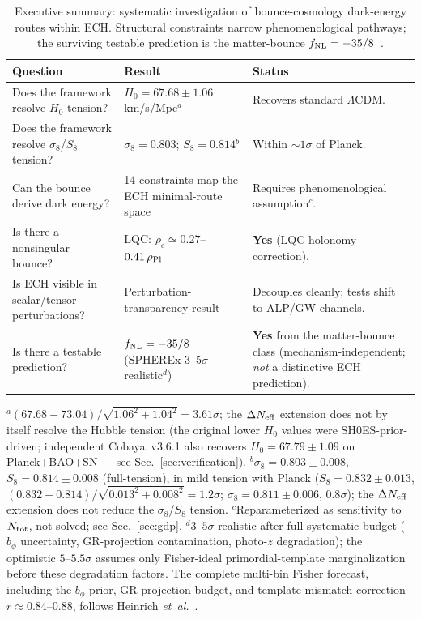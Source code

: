 \documentclass[aps,prd,twocolumn,superscriptaddress,showpacs,preprintnumbers,nofootinbib,longbibliography,floatfix]{revtex4-2}
\newcommand{\rhoPl}{\rho_{\rm Pl}}
\newcommand{\Neff}{N_{\rm eff}}
\newcommand{\etal}{\textit{et~al.}}
\begin{document}
\begin{table}[tb]
\caption{\label{tab:summary} Executive summary: systematic investigation of bounce-cosmology dark-energy routes within ECH. Structural constraints narrow phenomenological pathways; the surviving testable prediction is the matter-bounce $f_{\rm NL} = -35/8$~\cite{Cai:2009fn}.}
\begin{ruledtabular}
\begin{tabular}{lll}
\textbf{Question} & \textbf{Result} & \textbf{Status} \\
\hline
Does the framework resolve $H_0$ tension? & $H_0 = 67.68\pm 1.06$ km/s/Mpc$^a$ & Recovers standard $\Lambda$CDM. \\
Does the framework resolve $\sigma_8$/$S_8$ tension? & $\sigma_8 = 0.803$; $S_8 = 0.814$$^b$ & Within ${\sim}1\sigma$ of Planck. \\
Can the bounce derive dark energy? & 14 constraints map the ECH minimal-route space & Requires phenomenological assumption$^c$. \\
Is there a nonsingular bounce? & LQC: $\rho_c \simeq 0.27$--$0.41\,\rhoPl$ & \textbf{Yes} (LQC holonomy correction). \\
Is ECH visible in scalar/tensor perturbations? & Perturbation-transparency result & Decouples cleanly; tests shift to ALP/GW channels. \\
Is there a testable prediction? & $f_{\rm NL} = -35/8$ (SPHEREx $3$--$5\sigma$ realistic$^d$) & \textbf{Yes} from the matter-bounce class (mechanism-independent; \emph{not} a distinctive ECH prediction). \\
\end{tabular}
\end{ruledtabular}
\vspace{2pt}
{\small $^a$$(67.68-73.04)/\sqrt{1.06^2+1.04^2}=3.61\sigma$; the $\Delta\Neff$ extension does not by itself resolve the Hubble tension (the original lower $H_0$ values were SH0ES-prior-driven; independent Cobaya~v3.6.1 also recovers $H_0 = 67.79 \pm 1.09$ on Planck+BAO+SN --- see Sec.~\ref{sec:verification}). \quad $^b$$\sigma_8 = 0.803 \pm 0.008$, $S_8 = 0.814 \pm 0.008$ (full-tension), in mild tension with Planck ($S_8 = 0.832 \pm 0.013$, $(0.832 - 0.814)/\sqrt{0.013^2 + 0.008^2} = 1.2\sigma$; $\sigma_8 = 0.811 \pm 0.006$, $0.8\sigma$); the $\Delta\Neff$ extension does not reduce the $\sigma_8$/$S_8$ tension. \quad $^c$Reparameterized as sensitivity to $N_{\rm tot}$, not solved; see Sec.~\ref{sec:gdp}. \quad $^d$$3$--$5\sigma$ realistic after full systematic budget ($b_\phi$ uncertainty, GR-projection contamination, photo-$z$ degradation); the optimistic $5$--$5.5\sigma$ assumes only Fisher-ideal primordial-template marginalization before these degradation factors. The complete multi-bin Fisher forecast, including the $b_\phi$ prior, GR-projection budget, and template-mismatch correction $r \approx 0.84$--$0.88$, follows Heinrich \etal~\cite{Heinrich:2023}.}
\end{table}
\end{document}
